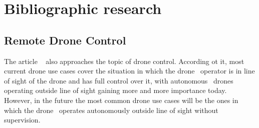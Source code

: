 \chapter{Bibliographic research}
\label{ch:research}


\section{Remote Drone Control}
\label{sec:research-remote-drone-control}
The article ~\cite{ericsson1} also approaches the topic of drone control.
According ot it, most current drone use cases cover the situation in which the drone \
operator is in line of sight of the drone and has full control over it, with autonomous \
drones operating outside line of sight gaining more and more importance today.
However, in the future the most common drone use cases will be the ones in which the drone \
operates autonomously outside line of sight without supervision.

